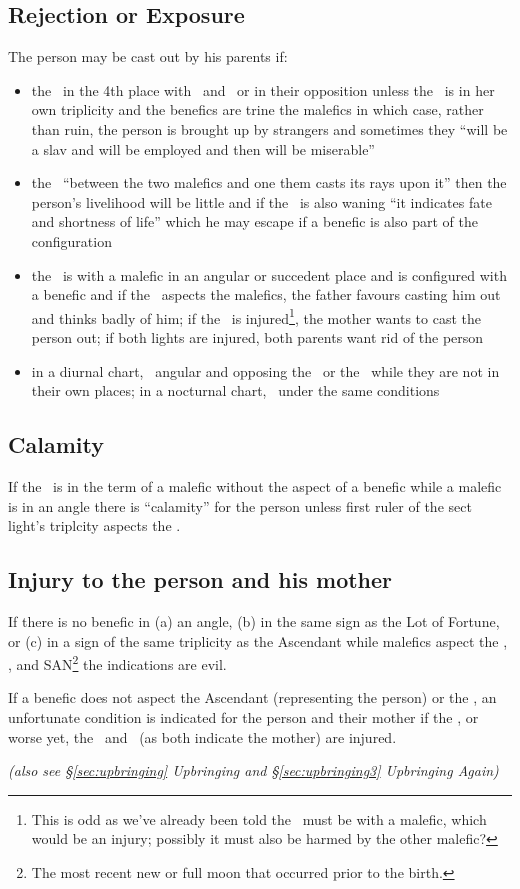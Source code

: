\subsection{Rejection or Exposure}
The person may be cast out by his parents if:
\begin{itemize}
\item the \Moon\, in the 4th place with \Saturn\, and \Mars\, or in their opposition unless the \Moon\, is in her own triplicity and the benefics are trine the malefics in which case, rather than ruin, the person is brought up by strangers and sometimes they ``will be a slav and will be employed and then will be miserable''

\item the \Moon\, ``between the two malefics and one them casts its rays upon it'' then the person's livelihood will be little and if the \Moon\, is also waning ``it indicates fate and shortness of life'' which he may escape if a benefic is also part of the configuration

\item the \Moon\, is with a malefic in an angular or succedent place and is configured with a benefic and if the \Sun\, aspects the malefics, the father favours casting him out and thinks badly of him; if the \Moon\, is injured\footnote{This is odd as we've already been told the \Moon\, must be with a malefic, which would be an injury; possibly it must also be harmed by the other malefic?}, the mother wants to cast the person out; if both lights are injured, both parents want rid of the person

\item in a diurnal chart, \Mars\, angular and opposing the \Moon\, or the \Sun\, while they are not in their own places; in a nocturnal chart, \Saturn\, under the same conditions
\end{itemize}

\subsection{Calamity}

If the \Moon\, is in the term of a malefic without the aspect of a benefic while a malefic is in an angle there is ``calamity'' for the person unless first ruler of the sect light's triplcity aspects the \Moon.

\subsection{Injury to the person and his mother}

If there is no benefic in (a) an angle, (b) in the same sign as the Lot of Fortune, or (c) in a sign of the same triplicity as the Ascendant while malefics aspect the \Sun, \Moon, and SAN\footnote{The most recent new or full moon that occurred prior to the birth.} the indications are evil.

If a benefic does not aspect the Ascendant (representing the person) or the \Moon, an unfortunate condition is indicated for the person and their mother if the \Moon, or worse yet, the \Moon\, and \Venus\, (as both indicate the mother) are injured.

\textsl{(also see \S\ref{sec:upbringing} Upbringing and \S\ref{sec:upbringing3} Upbringing Again)}